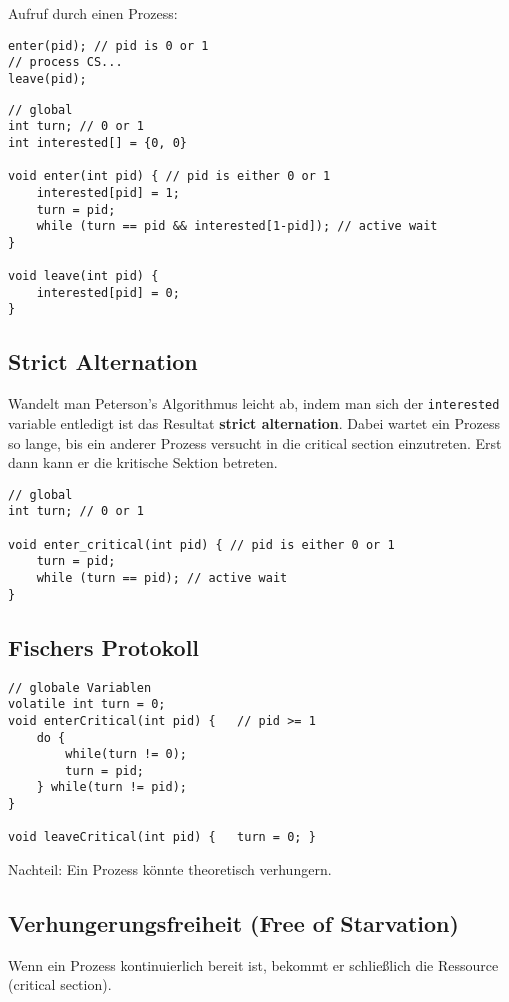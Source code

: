 Aufruf durch einen Prozess:
\begin{lstlisting}
enter(pid); // pid is 0 or 1
// process CS...
leave(pid);
\end{lstlisting}


\begin{lstlisting}
// global
int turn; // 0 or 1
int interested[] = {0, 0}

void enter(int pid) { // pid is either 0 or 1
	interested[pid] = 1;
	turn = pid;
	while (turn == pid && interested[1-pid]); // active wait
}

void leave(int pid) {
	interested[pid] = 0;
}
\end{lstlisting}


\subsection{Strict Alternation}
Wandelt man Peterson's Algorithmus leicht ab, indem man sich der \texttt{interested} variable entledigt ist das Resultat \textbf{strict alternation}. Dabei wartet ein Prozess so lange, bis ein anderer Prozess versucht in die critical section einzutreten. Erst dann kann er die kritische Sektion betreten.

\begin{lstlisting}
// global
int turn; // 0 or 1

void enter_critical(int pid) { // pid is either 0 or 1
	turn = pid;
	while (turn == pid); // active wait
}
\end{lstlisting}


\subsection{Fischers Protokoll}
\begin{lstlisting}
// globale Variablen 
volatile int turn = 0; 
void enterCritical(int pid) {	// pid >= 1 	
	do { 		
		while(turn != 0); 		
		turn = pid; 	
	} while(turn != pid); 
} 

void leaveCritical(int pid) { 	turn = 0; } 
\end{lstlisting}

Nachteil: Ein Prozess könnte theoretisch verhungern.

\subsection{Verhungerungsfreiheit (Free of Starvation)}
Wenn ein Prozess kontinuierlich bereit ist, bekommt er schließlich die Ressource (critical section).


